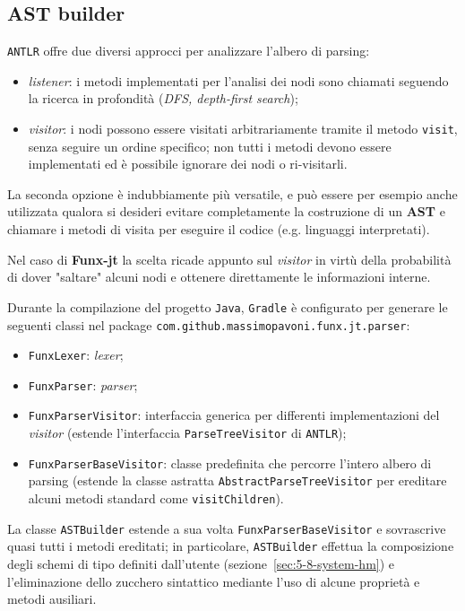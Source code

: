 \subsection{AST builder}
\label{sec:5-6-ast-builder}

\texttt{ANTLR} offre due diversi approcci per analizzare l'albero di parsing:
\begin{itemize}
    \item \textit{listener}: i metodi implementati per l'analisi dei nodi sono chiamati seguendo la ricerca
          in profondità (\textit{DFS, depth-first search});
    \item \textit{visitor}: i nodi possono essere visitati arbitrariamente tramite il metodo \texttt{visit},
          senza seguire un ordine specifico; non tutti i metodi devono essere implementati
          ed è possibile ignorare dei nodi o ri-visitarli.
\end{itemize}

\noindent La seconda opzione è indubbiamente più versatile, e può essere per esempio anche utilizzata
qualora si desideri evitare completamente la costruzione di un \textbf{AST} e chiamare i metodi di visita
per eseguire il codice (e.g. linguaggi interpretati).

\noindent Nel caso di \textbf{Funx-jt} la scelta ricade appunto sul \textit{visitor} in virtù
della probabilità di dover "saltare" alcuni nodi e ottenere direttamente le informazioni interne.

\noindent Durante la compilazione del progetto \texttt{Java}, \texttt{Gradle} è configurato per generare
le seguenti classi nel package \texttt{com.github.massimopavoni.funx.jt.parser}:
\begin{itemize}
    \item \texttt{FunxLexer}: \textit{lexer};
    \item \texttt{FunxParser}: \textit{parser};
    \item \texttt{FunxParserVisitor}: interfaccia generica per differenti implementazioni del \textit{visitor}
          (estende l'interfaccia \texttt{ParseTreeVisitor} di \texttt{ANTLR});
    \item \texttt{FunxParserBaseVisitor}: classe predefinita che percorre l'intero albero di parsing
          (estende la classe astratta \texttt{AbstractParseTreeVisitor} per ereditare alcuni metodi standard come \texttt{visitChildren}).
\end{itemize}

\noindent La classe \texttt{ASTBuilder} estende a sua volta \texttt{FunxParserBaseVisitor} e sovrascrive quasi tutti i metodi ereditati;
in particolare, \texttt{ASTBuilder} effettua la composizione degli schemi di tipo definiti dall'utente (sezione~\ref{sec:5-8-system-hm})
e l'eliminazione dello zucchero sintattico mediante l'uso di alcune proprietà e metodi ausiliari.


